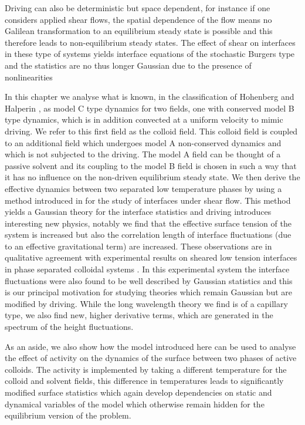 Driving can also be deterministic but space dependent, for instance if one considers applied shear flows, the spatial dependence of the flow means no Galilean transformation to an equilibrium steady state is possible and this therefore leads to non-equilibrium steady states. The effect of shear on interfaces in these type of systems yields interface equations of the stochastic Burgers type and the statistics are no thus longer Gaussian due to the presence of nonlinearities \cite{bray_interface_2001,bray_interface_2001-1,smith_interfaces_2008,smith_lateral_2010,thiebaud_nonequilibrium_2010,thiebaud_nonlinear_2014}

In this chapter we analyse what is known, in the classification of Hohenberg and Halperin \cite{hohenberg_theory_1977}, as model C type dynamics for two fields, one with conserved model B type dynamics, which is in addition convected at a uniform velocity to mimic driving. We refer to this first field as the colloid field.
This colloid field is coupled to an additional field which undergoes model A non-conserved dynamics and which is not subjected to the driving. The model A field can be thought of a passive solvent and its coupling to the model B field is chosen in such a way that it has no influence on the non-driven equilibrium steady state. We then derive the effective dynamics between two separated low temperature phases by using a
method introduced in \cite{bray_interface_2001,bray_interface_2001-1} for the study of interfaces under shear flow. This method yields a Gaussian theory for the interface statistics and driving introduces interesting new physics, notably we find that the effective surface tension of the system is increased but also the correlation length of interface fluctuations (due to an effective gravitational term) are increased. These observations are in qualitative agreement with experimental results on sheared low tension interfaces in phase separated colloidal systems \cite{derks_suppression_2006}. In this experimental system the interface fluctuations were also found to be well described by Gaussian statistics and this is our principal motivation for studying theories which remain Gaussian but are  modified by driving. While the long wavelength theory we find is of a capillary type, we also find new, higher derivative terms, which  are generated in the spectrum of the height fluctuations. 

As an aside, we also show how the model introduced here can be used to analyse the effect of activity on the dynamics of the surface between two phases of active colloids. The activity is implemented by taking a different temperature for the colloid and solvent fields, this difference in temperatures leads to significantly modified surface statistics which again develop dependencies on static and dynamical variables of the model which otherwise remain hidden for the equilibrium version of the problem.

